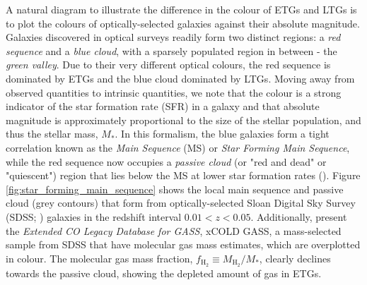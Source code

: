 A natural diagram to illustrate the difference in the colour of ETGs and LTGs is to plot the colours of optically-selected galaxies against their absolute magnitude. Galaxies discovered in optical surveys readily form two distinct regions: a \textit{red sequence} and a \textit{blue cloud}, with a sparsely populated region in between - the \textit{green valley}. Due to their very different optical colours, the red sequence is dominated by ETGs and the blue cloud dominated by LTGs. Moving away from observed quantities to intrinsic quantities, we note that the colour is a strong indicator of the star formation rate (SFR) in a galaxy and that absolute magnitude is approximately proportional to the size of the stellar population, and thus the stellar mass, $M_*$. In this formalism, the blue galaxies form a tight correlation known as the \textit{Main Sequence} (MS) or \textit{Star Forming Main Sequence}, while the red sequence now occupies a \textit{passive cloud} (or "red and dead" or "quiescent") region that lies below the MS at lower star formation rates (\citealt{Noeske_2007, Daddi_2007, Elbaz_2007, Rodighiero_2011}). Figure \ref{fig:star_forming_main_sequence} shows the local main sequence and passive cloud (grey contours) that form from optically-selected Sloan Digital Sky Survey (SDSS; \citealt{York_2000}) galaxies in the redshift interval $0.01 < z < 0.05$. Additionally, \citealt{Saintonge_2017} present the \textit{Extended CO Legacy Database for GASS}, xCOLD GASS, a mass-selected sample from SDSS that have molecular gas mass estimates, which are overplotted in colour. The molecular gas mass fraction, $f_{\textrm{H}_2} \equiv M_{\textrm{H}_2}/M_*$, clearly declines towards the passive cloud, showing the depleted amount of gas in ETGs.

